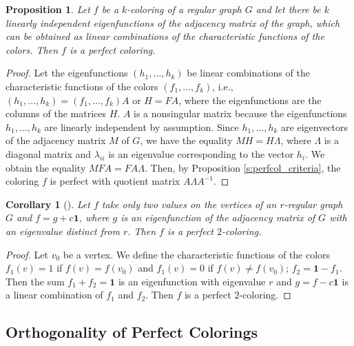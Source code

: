 \documentclass[11pt]{article}
\newtheorem{claim}{Proposition}[section]
\newtheorem{corollary}{Corollary}[section]
\theoremstyle{definition}
\begin{document}
{
\begin{claim}\label{c:colorlin}
Let $f$ be a $k$-coloring of a regular graph $G$  and
let there be $k$ linearly independent eigenfunctions of the adjacency matrix
of the graph, which can be obtained as linear combinations
of the characteristic functions of the colors. Then $f$ is a
perfect coloring.
\end{claim}
\begin{proof}
Let the eigenfunctions $(h_1,\dots, h_{k})$ be linear
combinations of the characteristic functions of the colors $(f_1,\dots, f_{k})$, i.e., $(h_1,\dots, h_{k}) = (f_1,\dots, f_{k}) A$ or
$H=FA$, where the eigenfunctions are the columns of the matrices $H$. $A$
is a nonsingular matrix because the eigenfunctions $h_1,\dots, h_{k}$
are linearly independent by assumption. Since $h_1,\dots, h_{k}$ are eigenvectors of the adjacency matrix $M$ of  $G$, we have the equality
$MH=H\Lambda$, where $\Lambda$ is a diagonal matrix and
$\lambda_{ii}$ is an eigenvalue corresponding to the vector $h_i$.
We obtain the equality $MFA=FA\Lambda$.
Then, by
Proposition \ref{s:perfcol_criteria}, the coloring $f$ is
perfect with quotient matrix $A\Lambda A^{-1}$. \end{proof}
}

\begin{corollary}[\cite{FdF2}]\label{corol5}
Let $f$ take only two values on the vertices of an $r$-regular
graph $G$ and $f=g+c\mathbf{1}$, where $g$ is an eigenfunction of the adjacency matrix
of $G$ with an eigenvalue distinct from $r$. Then $f$ is a
perfect $2$-coloring.
\end{corollary}
\begin{proof}
Let $v_0$ be a vertex. We define the characteristic
functions of the colors $f_1(v)=1$ if $f(v)=f(v_0)$ and $f_1(v)=0$ if
$f(v)\neq f(v_0)$; $f_2=\mathbf{1}-f_1$. Then the sum $f_1+f_2=\mathbf{1}$
is an eigenfunction with eigenvalue $r$ and $g=f-c\mathbf{1}$ is a
linear combination of $f_1$ and $f_2$. Then $f$
is a perfect $2$-coloring.
\end{proof}




\subsection{Orthogonality of Perfect Colorings}
\end{document}

